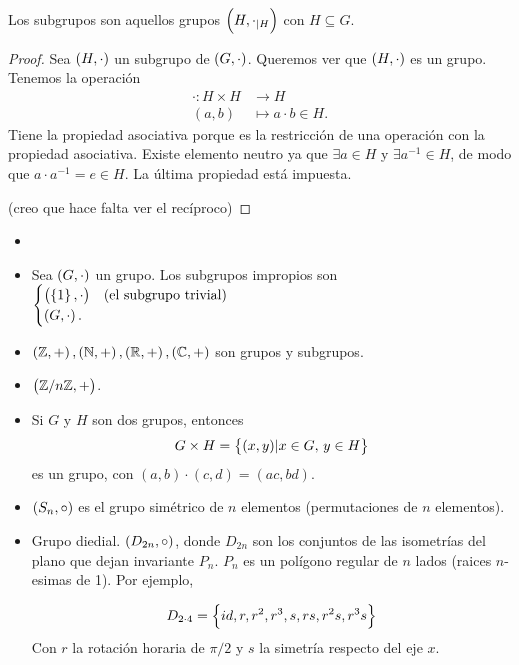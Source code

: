 \begin{obs}
    Los subgrupos son aquellos grupos $\left( H, \cdot_{\mid H} \right)$ con $H\subseteq G$.
\end{obs}
\begin{proof}
    Sea $\left( H, \cdot \right)$ un subgrupo de $\left( G, \cdot \right)$. Queremos ver que $\left( H, \cdot \right)$ es un grupo.
    Tenemos la operación
    \[
        \begin{aligned}
            \cdot \colon H \times H &\to H \\
            (a, b) &\mapsto a\cdot b \in H.
        \end{aligned}
    \]
    Tiene la propiedad asociativa porque es la restricción de una operación con la propiedad asociativa.
    Existe elemento neutro ya que $\exists a \in H$ y $\exists a^{-1} \in H$, de modo que $a\cdot a^{-1}=e \in H$.
    La última propiedad está impuesta.
    
    (creo que hace falta ver el recíproco)
\end{proof}

\begin{example}
    \begin{itemize}
        \item[]
        \item Sea $\left( G, \cdot \right)$ un grupo. Los subgrupos impropios son
                $\begin{cases}
                    \left( \left\{1\right\}, \cdot \right) &\text{(el subgrupo trivial)} \\
                    \left( G, \cdot \right). &
                \end{cases}$
        \item $\left( \mathbb{Z}, + \right), \left( \mathbb{N}, + \right), \left( \mathbb{R}, + \right), \left( \mathbb{C}, + \right)$ son grupos y subgrupos.
        \item $\left( \mathbb{Z}/n\mathbb{Z}, + \right)$.
        \item Si $G$ y $H$ son dos grupos, entonces
            \[
                 G \times H = \left\{(x,y) \vert x \in G, \, y \in H\right\}   
            \]
            es un grupo, con $(a, b) \cdot (c, d) = (ac, bd)$.
        \item $\left( S_n, \circ \right)$ es el grupo simétrico de $n$ elementos (permutaciones de $n$ elementos).
        \item Grupo diedial. $\left( D_{2n}, \circ \right)$, donde $D_{2n}$ son los conjuntos de las isometrías del plano que dejan invariante $P_n$.
            $P_n$ es un polígono regular de $n$ lados (raices $n$-esimas de 1). Por ejemplo,

            \[
                D_{2 \cdot 4} = \left\{id, r, r^2, r^3, s, rs, r^2s, r^3s\right\}
            \]
            Con $r$ la rotación horaria de $\pi / 2$ y $s$ la simetría respecto del eje $x$.
    \end{itemize}
\end{example}

